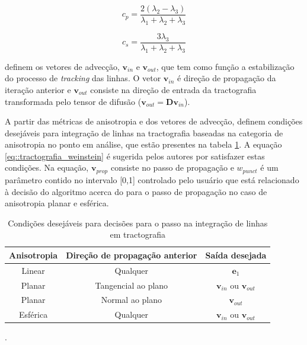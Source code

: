 \documentclass[
    12pt,                %
    oneside,            %
    a4paper,            %
    english,            %
    french,                %
    spanish,            %
    brazil                %
    ]{abntex2}
\begin{document}
\begin{equation}
\label{eq::cp}
    c_p = \frac{2(\lambda_2 - \lambda_3)}{\lambda_1 + \lambda_2 + \lambda_3}
\end{equation}

\begin{equation}
\label{eq::cs}
    c_s = \frac{3\lambda_3}{\lambda_1 + \lambda_2 + \lambda_3}
\end{equation}

 definem os vetores de advecção, $\mathbf{v}_{in}$ e $\mathbf{v}_{out}$, que tem como função a estabilização do processo de \textit{tracking} das linhas. O vetor $\mathbf{v}_{in}$ é direção de propagação da iteração anterior e $\mathbf{v}_{out}$  consiste na direção de entrada da tractografia transformada pelo tensor de difusão ($\mathbf{v}_{out} = \mathbf{D}\mathbf{v}_{in}$).

A partir das métricas de anisotropia e dos vetores de advecção,  definem condições desejáveis para integração de linhas na tractografia baseadas na categoria de anisotropia no ponto em análise, que estão presentes na tabela \ref{tab::tracto_desirable_conditions}. A equação \ref{eq::tractografia_weinstein} é sugerida pelos autores por satisfazer estas condições. Na equação, $\textbf{v}_{prop}$ consiste no passo de propagação e $w_{punct}$ é um parâmetro contido no intervalo [0,1] controlado pelo usuário que está relacionado à decisão do algoritmo acerca do  para o passo de propagação no caso de anisotropia planar e esférica.

\begin{table}[h]
\centering
\begin{tabular}{|c|c|c|}
\hline
\textbf{Anisotropia} & \textbf{Direção de propagação anterior} & \textbf{Saída desejada} \\ \hline
Linear               & Qualquer                                & $\mathbf{e}_1$                   \\ \hline
Planar               & Tangencial ao plano                     & $\mathbf{v}_{in}$ ou $\mathbf{v}_{out}$   \\ \hline
Planar               & Normal ao plano                         & $\mathbf{v}_{out}$            \\ \hline
Esférica             & Qualquer                                & $\mathbf{v}_{in}$ ou $\mathbf{v}_{out}$   \\ \hline
\end{tabular}
\caption{Condições desejáveis para decisões para o passo na integração de linhas em tractografia \cite{Weinstein1999}}.
\label{tab::tracto_desirable_conditions}
\end{table}
\end{document}
